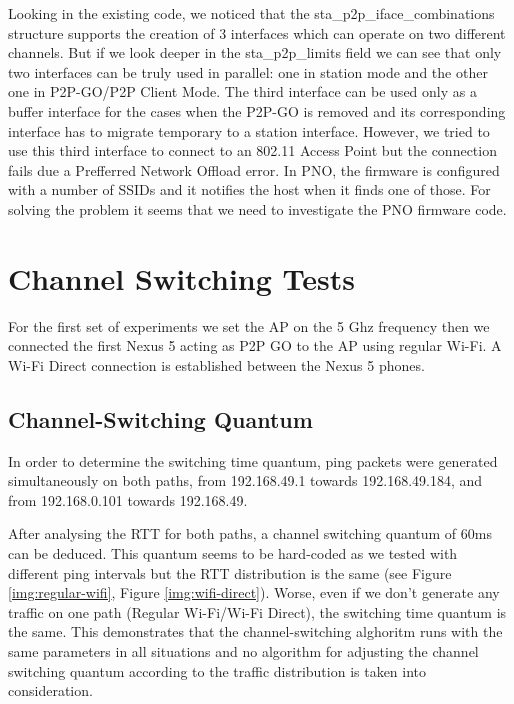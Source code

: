 Looking in the existing code, we noticed that the sta_p2p_iface_combinations structure supports the creation of 3 interfaces which can operate on two different channels. But if we look deeper in the sta_p2p_limits field we can see that only two interfaces can be truly used in parallel: one in station mode and the other one in P2P-GO/P2P Client Mode. The third interface can be used only as a buffer interface for the cases when the P2P-GO is removed and its corresponding interface has to migrate temporary to a station interface. However, we tried to use this third interface to connect to an 802.11 Access Point but the connection fails due a Prefferred Network Offload error. In PNO, the firmware is configured with a number of SSIDs and it notifies the host when it finds one of those. For solving the problem it seems that we need to investigate the PNO firmware code.

\section{Channel Switching Tests}
\label{sec:nexus5-chsw}

For the first set of experiments we set the AP on the 5 Ghz frequency then we connected the first Nexus 5 acting as P2P GO to the AP using regular Wi-Fi. A Wi-Fi Direct connection is established between the Nexus 5 phones.
 

\subsection{Channel-Switching Quantum}
\label{sub-sec:chsw-time}

In order to determine the switching time quantum, ping packets were generated simultaneously on both paths, from 192.168.49.1 towards 192.168.49.184, and from 192.168.0.101 towards 192.168.49.

After analysing the RTT for both paths, a channel switching quantum of 60ms can be deduced. This quantum seems to be hard-coded as we tested with different ping intervals but the RTT distribution is the same (see Figure \ref{img:regular-wifi}, Figure \ref{img:wifi-direct}). Worse, even if we don't generate any traffic on one path (Regular Wi-Fi/Wi-Fi Direct), the switching time quantum is the same. This demonstrates that the channel-switching alghoritm runs with the same parameters in all situations and no algorithm for adjusting the channel switching quantum according to the traffic distribution is taken into consideration.

